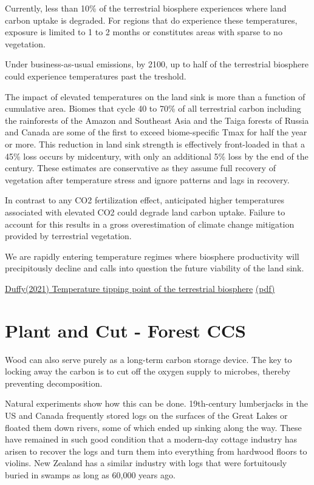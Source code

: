 \documentclass[
]{book}
\begin{document}
Currently, less than 10\% of the terrestrial biosphere experiences
where land carbon uptake is degraded.
For regions that do experience these temperatures,
exposure is limited to 1 to 2 months or
constitutes areas with sparse to no vegetation.

Under business-as-usual emissions, by 2100, up to half
of the terrestrial biosphere could experience temperatures past
the treshold.

The impact of elevated temperatures on the land sink is more than a
function of cumulative area.
Biomes that cycle 40 to 70\% of all terrestrial carbon
including the rainforests of the Amazon and Southeast Asia and
the Taiga forests of Russia and Canada
are some of the first to exceed biome-specific Tmax
for half the year or more.
This reduction in land sink strength is effectively front-loaded
in that a 45\% loss occurs by midcentury,
with only an additional 5\% loss by the end of the century.
These estimates are conservative as they assume
full recovery of vegetation after temperature stress and
ignore patterns and lags in recovery.

In contrast to any CO2 fertilization effect,
anticipated higher temperatures associated with
elevated CO2 could degrade land carbon uptake.
Failure to account for this results in
a gross overestimation of climate change mitigation provided by terrestrial vegetation.

We are rapidly entering temperature regimes where biosphere productivity
will precipitously decline and
calls into question the future viability of the land sink.

\href{https://advances.sciencemag.org/content/7/3/eaay1052}{Duffy(2021) Temperature tipping point of the terrestrial biosphere}
\href{pdf/Duffy_2020_Temperature_Tipping_Point.pdf}{(pdf)}

\hypertarget{plant-and-cut---forest-ccs}{%
\section{Plant and Cut - Forest CCS}\label{plant-and-cut---forest-ccs}}

Wood can also serve purely as a long-term carbon storage device. The key to locking away the carbon is to cut off the oxygen supply to microbes, thereby preventing decomposition.

Natural experiments show how this can be done. 19th-century lumberjacks in the US and Canada frequently stored logs on the surfaces of the Great Lakes or floated them down rivers, some of which ended up sinking along the way. These have remained in such good condition that a modern-day cottage industry has arisen to recover the logs and turn them into everything from hardwood floors to violins. New Zealand has a similar industry with logs that were fortuitously buried in swamps as long as 60,000 years ago.
\end{document}
